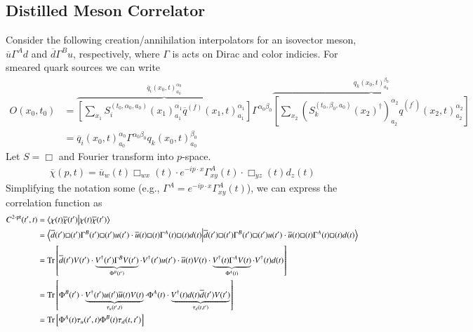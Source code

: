 \subsection{Distilled Meson Correlator}
Consider the following creation/annihilation interpolators for an isovector meson, $\overline u \Gamma^A d$ and $\overline d \Gamma^B u$, respectively, where $\Gamma$ is acts on Dirac and color indicies. For smeared quark sources we can write \cite{Cheung:2019fsx}
\begin{align}
O(x_0, t_0) &= 
\overbrace{\left[\sum_{x_1}
S^{(t_0, \alpha_0, a_0)}_i (x_1)^{\alpha_1}_{a_1} 
\overline q^{(f)}(x_1, t)^{\alpha_1}_{a_1}
\right]}^{\overline q_i(x_0, t)^{\alpha_0}_{a_0}}
\Gamma^{\alpha_0 \beta_0} 
\overbrace{\left[\sum_{x_2} (S^{(t_0, \beta_0, a_0)}_k(x_2)^\dagger)^{ \alpha_2}_{a_2} q^{(f^\prime)}(x_2, t)^{\alpha_2}_{a_2}
\right]}^{q_k(x_0, t)^{\beta_0}_{a_0}} \\
&=
\overline q_i(x_0, t)^{\alpha_0}_{a_0}
\Gamma^{\alpha_0 \beta_0} 
q_k(x_0, t)^{\beta_0}_{a_0}
\end{align}
Let $S = \Box$ and Fourier transform into $p$-space. 
\begin{align}
\overline \chi(p, t) = \overline u_w(t) \Box_{wx}(t) \cdot e^{-ip\cdot x} \Gamma^A_{xy}(t) \cdot \Box_{yz}(t) d_z(t)
\end{align}
Simplifying the notation some (e.g., $\Gamma^A = e^{-ip\cdot x} \Gamma^A_{xy}(t)$), we can express the correlation function as 
\begin{align}
C^{2\text{-pt}}(t^\prime, t) &= \braket{\chi(t) \overline \chi(t^\prime)} \\
&= \braket{
\overline d(t^\prime) \Box(t^\prime) \Gamma^B(t^\prime) \Box(t^\prime)u(t^\prime) \cdot
\overline u(t) \Box(t) \Gamma^A(t) \Box(t) d(t)
} \\ 
&= \text{Tr}
\left[
\overline d(t^\prime) V(t^\prime) 
\cdot
\underbrace{V^\dagger(t^\prime) \Gamma^B V(t^\prime)}_{\Phi^B(t^\prime)} 
\cdot 
V^\dagger(t^\prime) u(t^\prime)
\cdot
\overline u(t) V(t) 
\cdot
\underbrace{V^\dagger(t) \Gamma^A V(t)}_{\Phi^A(t)} 
\cdot
V^\dagger(t) d(t)
\right] \\
&= \text{Tr} \left[
\Phi^B(t^\prime) 
\cdot
\underbrace{V^\dagger(t^\prime) u(t^\prime) \overline u(t) V(t)}_{\tau_u(t^\prime, t)}
\cdot
\Phi^A(t)
\cdot
\underbrace{V^\dagger(t) d(t) \overline d(t^\prime) V(t^\prime)}_{\tau_d(t, t^\prime)}
\right] \\
&= \text{Tr}\left[
\Phi^A(t)
\tau_u(t^\prime, t)
\Phi^B(t)
\tau_d(t, t^\prime)
\right]
\end{align}

